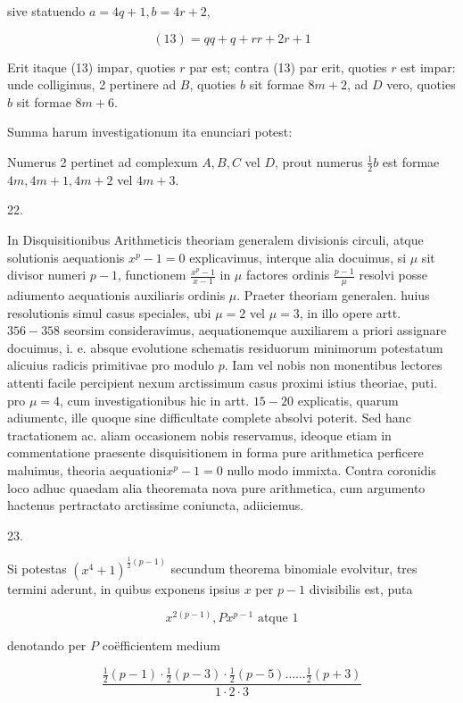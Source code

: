 \documentclass[10pt]{article}
\begin{document}
sive statuendo \(a=4 q+1, b=4 r+2\),

\[
(13)=q q+q+r r+2 r+1
\]

Erit itaque (13) impar, quoties \(r\) par est; contra (13) par erit, quoties \(r\) est impar: unde colligimus, 2 pertinere ad \(B\), quoties \(b\) sit formae \(8 m+2\), ad \(D\) vero, quoties \(b\) sit formae \(8 m+6\).

Summa harum investigationum ita enunciari potest:

Numerus 2 pertinet ad complexum \(A, B, C\) vel \(D\), prout numerus \(\frac{1}{2} b\) est formae \(4 m, 4 m+1,4 m+2\) vel \(4 m+3\).

22.

In Disquisitionibus Arithmeticis theoriam generalem divisionis circuli, atque solutionis aequationis \(x^{p}-1=0\) explicavimus, interque alia docuimus, si \(\mu\) sit divisor numeri \(p-1\), functionem \(\frac{x^{p}-1}{x-1}\) in \(\mu\) factores ordinis \(\frac{p-1}{\mu}\) resolvi posse adiumento aequationis auxiliaris ordinis \(\mu\). Praeter theoriam generalen. huius resolutionis simul casus speciales, ubi \(\mu=2\) vel \(\mu=3\), in illo opere artt. \(356-358\) seorsim consideravimus, aequationemque auxiliarem a priori assignare docuimus, i. e. absque evolutione schematis residuorum minimorum potestatum alicuius radicis primitivae pro modulo \(p\). Iam vel nobis non monentibus lectores attenti facile percipient nexum arctissimum casus proximi istius theoriae, puti. pro \(\mu=4\), cum investigationibus hic in artt. \(15-20\) explicatis, quarum adiumentc, ille quoque sine difficultate complete absolvi poterit. Sed hanc tractationem ac. aliam occasionem nobis reservamus, ideoque etiam in commentatione praesente disquisitionem in forma pure arithmetica perficere maluimus, theoria aequationi\(x^{p}-1=0\) nullo modo immixta. Contra coronidis loco adhuc quaedam alia theoremata nova pure arithmetica, cum argumento hactenus pertractato arctissime coniuncta, adiiciemus.

23.

Si potestas \(\left(x^{4}+1\right)^{\frac{1}{2}(p-1)}\) secundum theorema binomiale evolvitur, tres termini aderunt, in quibus exponens ipsius \(x\) per \(p-1\) divisibilis est, puta

\[
x^{2(p-1)}, P x^{p-1} \text { atque } 1
\]

denotando per \(P\) coëfficientem medium

\[
\frac{\frac{1}{2}(p-1) \cdot \frac{1}{2}(p-3) \cdot \frac{1}{2}(p-5) \ldots \ldots \frac{1}{2}(p+3)}{1 \cdot 2 \cdot 3}
\]
\end{document}
